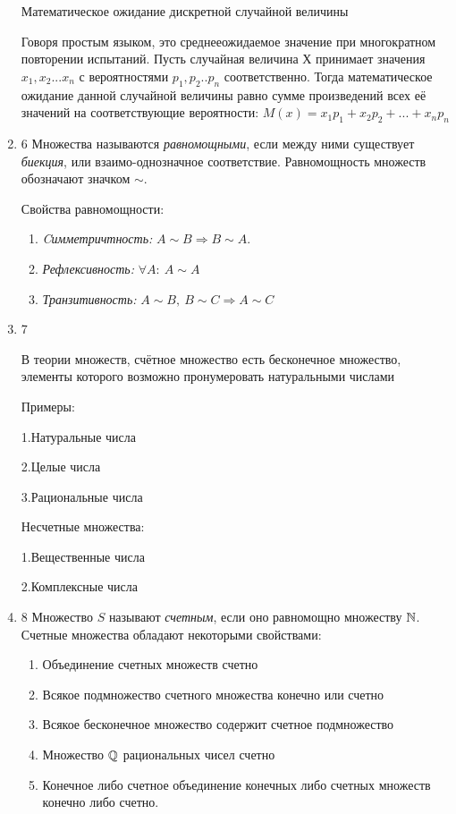 \documentclass[a4paper,12pt]{article}
\begin{document}
\begin{enumerate}
	    Математическое ожидание дискретной случайной величины

	Говоря простым языком, это среднееожидаемое значение при многократном повторении испытаний. Пусть случайная величина Х принимает значения $x_1, x_2 ... x_n$ с вероятностями $p_1, p_2 .. p_n$ соответственно. Тогда математическое ожидание  данной случайной величины равно сумме произведений всех её значений на соответствующие вероятности:
	$M(x) = x_1 p_1 + x_2 p_2 + ... + x_n p_n$
		\item 6
		Множества называются \textit{равномощными}, если между ними существует \textit{биекция}, или взаимо-однозначное 	соответствие. Равномощность множеств обозначают значком $\sim$.
		
		Свойства равномощности:
		\begin{enumerate}
			\item \textit{Cимметричтность:} $A \sim B \Rightarrow B \sim A$.
			\item \textit{Рефлексивность:} $\forall A: \ A \sim A$
			\item \textit{Транзитивность:} $A \sim B, \ B \sim C  \Rightarrow A \sim C$
		\end{enumerate}
	\item 7
    
    В теории множеств, счётное множество есть бесконечное множество, элементы которого возможно пронумеровать натуральными числами
    
    Примеры: 
    
    
    1.Натуральные числа
    
    2.Целые числа
    
    3.Рациональные числа
    
    
    Несчетные множества:
    
    
    1.Вещественные числа
    
    2.Комплексные числа
		\item 8
		Множество $S$ называют \textit{счетным}, если оно равномощно множеству $\mathbb{N}$.	Счетные множества обладают некоторыми свойствами:
		\begin{enumerate}
			\item Объединение счетных множеств счетно
			\item Всякое подмножество счетного множества конечно или счетно
			\item Всякое бесконечное множество содержит счетное подмножество
			\item Множество $\mathbb{Q}$ рациональных чисел счетно
			\item 
			Конечное либо счетное объединение конечных либо счетных множеств конечно либо счетно.
			

\end{enumerate}
\end{enumerate}
\end{document}
